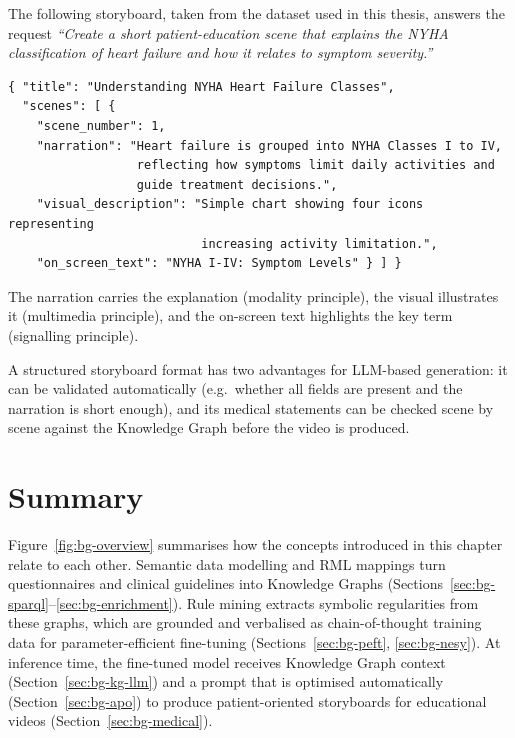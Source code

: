 \begin{bgexample}
The following storyboard, taken from the dataset used in this thesis, answers
the request \emph{``Create a short patient-education scene that explains the
NYHA classification of heart failure and how it relates to symptom
severity.''}
\begin{lstlisting}[style=bgcode]
{ "title": "Understanding NYHA Heart Failure Classes",
  "scenes": [ {
    "scene_number": 1,
    "narration": "Heart failure is grouped into NYHA Classes I to IV,
                  reflecting how symptoms limit daily activities and
                  guide treatment decisions.",
    "visual_description": "Simple chart showing four icons representing
                           increasing activity limitation.",
    "on_screen_text": "NYHA I-IV: Symptom Levels" } ] }
\end{lstlisting}
The narration carries the explanation (modality principle), the visual
illustrates it (multimedia principle), and the on-screen text highlights the
key term (signalling principle).
\end{bgexample}

A structured storyboard format has two advantages for LLM-based generation:
it can be validated automatically (e.g.\ whether all fields are present and
the narration is short enough), and its medical statements can be checked
scene by scene against the Knowledge Graph before the video is produced.

\section{Summary}
\label{sec:bg-summary}

Figure~\ref{fig:bg-overview} summarises how the concepts introduced in this
chapter relate to each other. Semantic data modelling and RML mappings turn
questionnaires and clinical guidelines into Knowledge Graphs
(Sections~\ref{sec:bg-sparql}--\ref{sec:bg-enrichment}). Rule mining extracts
symbolic regularities from these graphs, which are grounded and verbalised
as chain-of-thought training data for parameter-efficient fine-tuning
(Sections~\ref{sec:bg-peft}, \ref{sec:bg-nesy}). At inference time, the
fine-tuned model receives Knowledge Graph context (Section~\ref{sec:bg-kg-llm})
and a prompt that is optimised automatically (Section~\ref{sec:bg-apo}) to
produce patient-oriented storyboards for educational videos
(Section~\ref{sec:bg-medical}).

